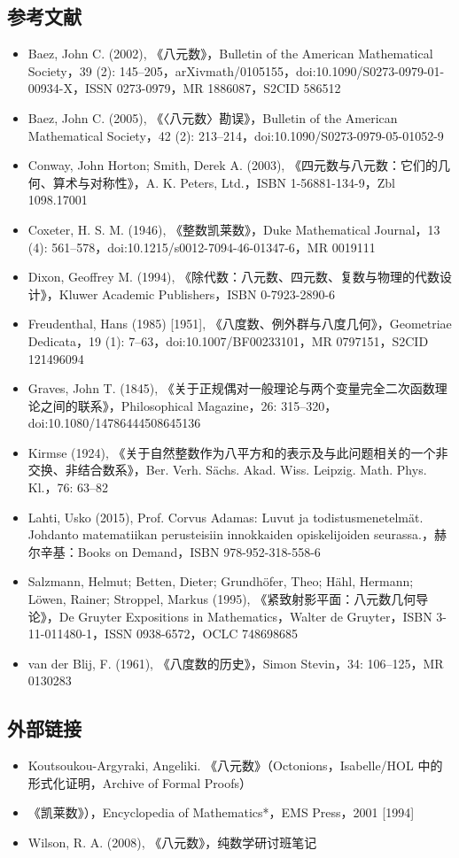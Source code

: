 \subsection{参考文献}
\begin{itemize}
\item Baez, John C. (2002), 《八元数》，Bulletin of the American Mathematical Society，39 (2): 145–205，arXiv\:math/0105155，doi:10.1090/S0273-0979-01-00934-X，ISSN 0273-0979，MR 1886087，S2CID 586512
\item Baez, John C. (2005), 《〈八元数〉勘误》，Bulletin of the American Mathematical Society，42 (2): 213–214，doi:10.1090/S0273-0979-05-01052-9
\item Conway, John Horton; Smith, Derek A. (2003), 《四元数与八元数：它们的几何、算术与对称性》，A. K. Peters, Ltd.，ISBN 1-56881-134-9，Zbl 1098.17001
\item Coxeter, H. S. M. (1946), 《整数凯莱数》，Duke Mathematical Journal，13 (4): 561–578，doi:10.1215/s0012-7094-46-01347-6，MR 0019111
\item Dixon, Geoffrey M. (1994), 《除代数：八元数、四元数、复数与物理的代数设计》，Kluwer Academic Publishers，ISBN 0-7923-2890-6
\item Freudenthal, Hans (1985) [1951], 《八度数、例外群与八度几何》，Geometriae Dedicata，19 (1): 7–63，doi:10.1007/BF00233101，MR 0797151，S2CID 121496094
\item Graves, John T. (1845), 《关于正规偶对一般理论与两个变量完全二次函数理论之间的联系》，Philosophical Magazine，26: 315–320，doi:10.1080/14786444508645136
\item Kirmse (1924), 《关于自然整数作为八平方和的表示及与此问题相关的一个非交换、非结合数系》，Ber. Verh. Sächs. Akad. Wiss. Leipzig. Math. Phys. Kl.，76: 63–82
\item Lahti, Usko (2015), Prof. Corvus Adamas: Luvut ja todistusmenetelmät. Johdanto matematiikan perusteisiin innokkaiden opiskelijoiden seurassa.，赫尔辛基：Books on Demand，ISBN 978-952-318-558-6
\item Salzmann, Helmut; Betten, Dieter; Grundhöfer, Theo; Hähl, Hermann; Löwen, Rainer; Stroppel, Markus (1995), 《紧致射影平面：八元数几何导论》，De Gruyter Expositions in Mathematics，Walter de Gruyter，ISBN 3-11-011480-1，ISSN 0938-6572，OCLC 748698685
\item van der Blij, F. (1961), 《八度数的历史》，Simon Stevin，34: 106–125，MR 0130283
\end{itemize}
\subsection{外部链接}
\begin{itemize}
\item Koutsoukou-Argyraki, Angeliki. 《八元数》（Octonions，Isabelle/HOL 中的形式化证明，Archive of Formal Proofs）
\item 《凯莱数》），Encyclopedia of Mathematics*，EMS Press，2001 [1994]
\item Wilson, R. A. (2008), 《八元数》，纯数学研讨班笔记 
\end{itemize}


